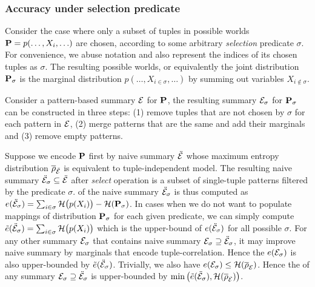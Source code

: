 \subsubsection{Accuracy under selection predicate}
Consider the case where only a subset of tuples in possible worlds $\mathbf{P}=p(\ldots,X_i,\ldots)$ are chosen, according to some arbitrary \emph{selection} predicate $\sigma$. 
For convenience, we abuse notation and also represent the indices of its chosen tuples as $\sigma$.
The resulting possible worlds, or equivalently the joint distribution $\mathbf{P}_{\sigma}$ is the marginal distribution $p(\ldots,X_{i\in\sigma},\ldots)$ by summing out variables $X_{i\not\in\sigma}$.

Consider a pattern-based summary $\mathcal E$ for $\mathbf{P}$, the resulting summary $\mathcal E_{\sigma}$ for $\mathbf{P}_{\sigma}$ can be constructed in three steps: (1) remove tuples that are not chosen by $\sigma$ for each pattern in $\mathcal E$, (2) merge patterns that are the same and add their marginals and (3) remove empty patterns.

Suppose we encode $\mathbf{P}$ first by naive summary $\ddot{\mathcal E}$ whose maximum entropy distribution $\overline{\rho}_{\ddot{\mathcal E}}$ is equivalent to tuple-independent model.
The resulting naive summary $\ddot{\mathcal E}_{\sigma}\subseteq \ddot{\mathcal E}$ after \emph{select} operation is a subset of single-tuple patterns filtered by the predicate $\sigma$. 
\Errorname of the naive summary $\ddot{\mathcal E}_{\sigma}$ is thus computed as $e(\ddot{\mathcal E}_{\sigma})=\sum_{i\in\sigma} \mathcal{H}\big(p(X_i)\big)-\mathcal{H}(\mathbf{P}_{\sigma})$.
In cases when we do not want to populate mappings of distribution $\mathbf{P}_{\sigma}$ for each given predicate, we can simply compute $\tilde{e}(\ddot{\mathcal E}_{\sigma})=\sum_{i\in\sigma} \mathcal{H}\big(p(X_i)\big)$ which is the upper-bound of $e(\ddot{\mathcal E}_{\sigma})$ for all possible $\sigma$.
For any other summary $\mathcal E_{\sigma}$ that contains naive summary $\mathcal E_{\sigma}\supseteq \ddot{\mathcal E}_{\sigma}$, it may improve naive summary by marginals that encode tuple-correlation.
Hence the \Errorname $e(\mathcal E_{\sigma})$ is also upper-bounded by $\tilde{e}(\ddot{\mathcal E}_{\sigma})$.
Trivially, we also have $e(\mathcal E_{\sigma})\leq \mathcal{H}(\overline{\rho}_{\mathcal E})$.
Hence the \Errorname of any summary $\mathcal E_{\sigma}\supseteq\ddot{\mathcal E}_{\sigma}$ is upper-bounded by $\min\big(\tilde{e}(\ddot{\mathcal E}_{\sigma}),\mathcal{H}(\overline{\rho}_{\mathcal E})\big)$.

